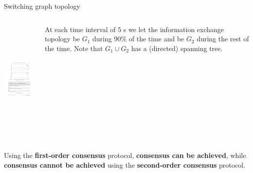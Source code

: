 \begin{frame}{Switching graph topology}

\begin{columns}
 \begin{column}{.70\textwidth}
	\begin{center}
		\includegraphics[height=6cm]{images/Switch1.pdf}
	\end{center}
	\vskip 0.3cm
 \end{column}

 \begin{column}{.30\textwidth}
	At each time interval of 5 s we let the information exchange topology be $G_1$ during 90\% of the time 
	and be $G_2$ during the rest of the time. 
	Note that $G_1 \cup G_2$ has a (directed) spanning tree. 
 \end{column}
\end{columns}
Using the {\textcolor{green!40!black}{\fontsize{13}{15}\textbf{first-order consensus}}} protocol, 
{\textcolor{green!40!black}{\fontsize{13}{15}\textbf{consensus can be achieved}}}, 
while {\textcolor{green!40!black}{\fontsize{13}{15}\textbf{consensus cannot be achieved}}} 
using the {\textcolor{green!40!black}{\fontsize{13}{15}\textbf{second-order consensus}}} protocol. 
\vskip 0.3cm

\end{frame}

